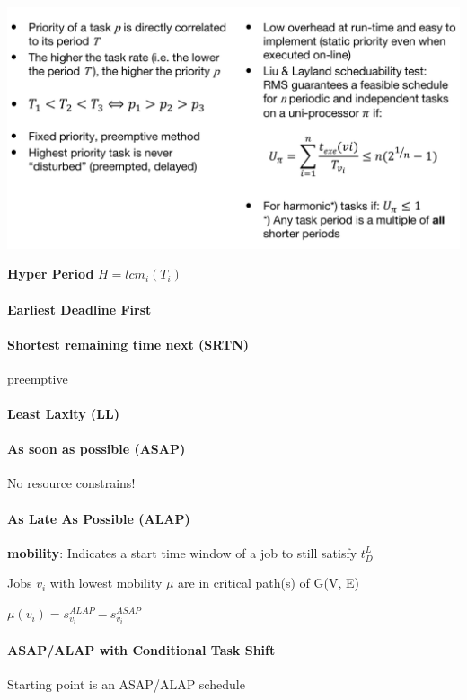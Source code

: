 \documentclass[english]{latex4ei/latex4ei_sheet}
\begin{document}
\begin{center}
  \centering
  \includegraphics[width=\linewidth]{assets/RateMonotonicScheduling.png}
  \label{fig:ratemonotonicscheduling}
\end{center}

\textbf{Hyper Period} $H = lcm_i(T_i)$

\paragraph{Earliest Deadline First}

\paragraph{Shortest remaining time next (SRTN)}
preemptive

\paragraph{Least Laxity (LL)}

\paragraph{As soon as possible (ASAP)}
No resource constrains!

\paragraph{As Late As Possible (ALAP)}
\textbf{mobility}: Indicates a start time window of a job to still satisfy $t_D^L$ 

Jobs $v_i$ with lowest mobility $\mu$ are in critical path(s) of G(V, E)

$\mu(v_i) = s_{v_i}^{ALAP} - s_{v_i}^{ASAP}$

\paragraph{ASAP/ALAP with Conditional Task Shift}
Starting point is an ASAP/ALAP schedule
\end{document}
